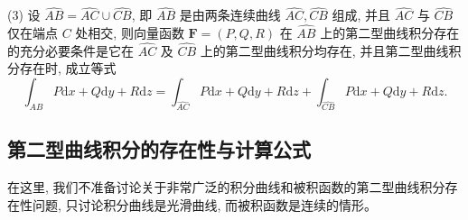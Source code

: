 \documentclass[12pt,fontset=fandol]{ctexart}
\begin{document}
\begin{definition}
(3) 设 $\widehat{AB}=\widehat{AC}\cup\widehat{CB}$, 即 $\widehat{AB}$ 是由两条连续曲线 $\widehat{AC},\widehat{CB}$ 组成, 并且 $\widehat{AC}$ 与 $\widehat{CB}$ 仅在端点 $C$ 处相交, 则向量函数 $\boldsymbol F=(P,Q,R)$ 在 $\widehat{AB}$ 上的第二型曲线积分存在的充分必要条件是它在 $\widehat{AC}$ 及 $\widehat{CB}$ 上的第二型曲线积分均存在, 并且第二型曲线积分存在时, 成立等式
\[
  \int_{\widehat{AB}}P\mathrm dx+Q\mathrm dy+R\mathrm dz
  =\int_{\widehat{AC}}P\mathrm dx+Q\mathrm dy+R\mathrm dz
  +\int_{\widehat{CB}}P\mathrm dx+Q\mathrm dy+R\mathrm dz.
\]

\end{definition}
\subsection{第二型曲线积分的存在性与计算公式}

在这里, 我们不准备讨论关于非常广泛的积分曲线和被积函数的第二型曲线积分存在性问题, 只讨论积分曲线是光滑曲线, 而被积函数是连续的情形。
\end{document}
